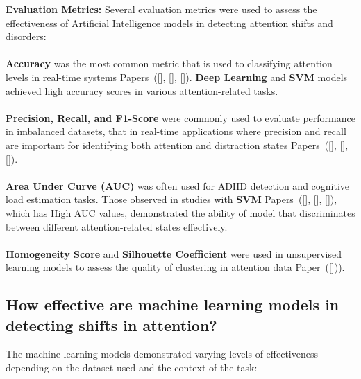 \documentclass[12pt]{article}
\begin{document}
\textbf{Evaluation Metrics:} Several evaluation metrics were used to assess the effectiveness of Artificial Intelligence models in detecting attention shifts and disorders:  \\ \\
\textbullet \textbf{Accuracy} was the most common metric that is used to classifying attention levels in real-time systems Papers~([\citealp{ref1}], [\citealp{ref3}], [\citealp{ref8}]). \textbf{Deep Learning} and \textbf{SVM} models achieved high accuracy scores in various attention-related tasks.  \\ \\
\textbullet \textbf{Precision, Recall, and F1-Score} were commonly used to evaluate performance in imbalanced datasets, that in real-time applications where precision and recall are important for identifying both attention and distraction states Papers~([\citealp{ref2}], [\citealp{ref6}], [\citealp{ref9}]).  \\ \\
\textbullet \textbf{Area Under Curve (AUC)} was often used for ADHD detection and cognitive load estimation tasks. Those observed in studies with \textbf{SVM} Papers~([\citealp{ref11}], [\citealp{ref12}], [\citealp{ref19}]), which has High AUC values, demonstrated the ability of model that discriminates between different attention-related states effectively.  \\ \\
\textbullet \textbf{Homogeneity Score} and \textbf{Silhouette Coefficient} were used in unsupervised learning models to assess the quality of clustering in attention data Paper~([\citealp{ref4}])).  \\ 

\subsection{How effective are machine learning models in detecting shifts in attention?} 
The machine learning models demonstrated varying levels of effectiveness depending on the dataset used and the context of the task: \\ 
\end{document}
